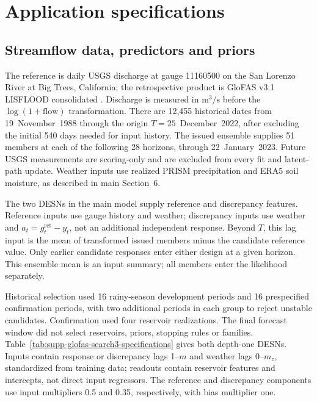 \documentclass[12pt,letterpaper]{article}
\numberwithin{suppalgorithm}{section}
\numberwithin{equation}{section}
\numberwithin{table}{section}
\numberwithin{figure}{section}
\begin{document}


\clearpage
\section{Application specifications}
\label{sec:appendix-applications}

\subsection{Streamflow data, predictors and priors}
\label{sec:glofas_discrepancy}
\label{subsec:glofas_aug_design}

The reference is daily USGS discharge at gauge 11160500 on the San
Lorenzo River at Big Trees, California; the retrospective product is
GloFAS v3.1 LISFLOOD consolidated
\citep{AlfieriEtAl2013GloFAS,HarriganEtAl2023GloFASForecasts}.
Discharge is measured in \(\mathrm m^3/\mathrm s\) before the
\(\log(1+\mathrm{flow})\) transformation. There are 12,455 historical
dates from 19~November~1988 through the origin \(T=25\)~December~2022,
after excluding the initial 540 days needed for input history. The issued
ensemble supplies 51 members at each of the following 28 horizons, through
22~January~2023. Future USGS measurements are scoring-only and are
excluded from every fit and latent-path update. Weather inputs use realized
PRISM precipitation and ERA5 soil moisture, as described in main Section~6.

The two DESNs in the main model supply reference and discrepancy features.
Reference inputs use gauge history and weather; discrepancy inputs use
weather and \(a_t=g_t^{\mathrm{ret}}-y_t\), not an additional independent
response. Beyond \(T\), this lag input is the mean of transformed
issued members minus the candidate reference value. Only earlier candidate
responses enter either design at a given horizon. This ensemble mean is
an input summary; all members enter the likelihood separately.

Historical selection used 16 rainy-season development periods and 16
prespecified confirmation periods, with two additional periods in each
group to reject unstable candidates. Confirmation used four reservoir
realizations. The final forecast window did not select reservoirs, priors,
stopping rules or families. Table~\ref{tab:supp-glofas-search3-specifications}
gives both depth-one DESNs. Inputs contain response or discrepancy lags
1--\(m\) and weather lags 0--\(m_z\), standardized from training data;
readouts contain reservoir features and intercepts, not direct input
regressors. The reference and discrepancy components use input multipliers
0.5 and 0.35, respectively, with bias multiplier one.
\end{document}
